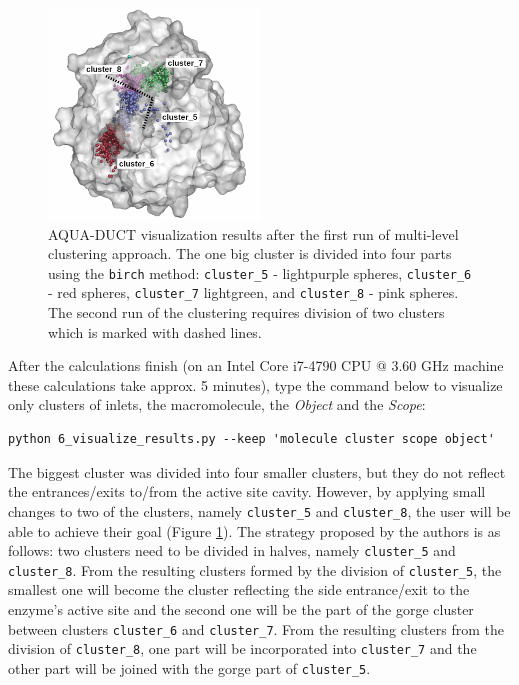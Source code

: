 \documentclass[9pt,tutorial]{livecoms}
\begin{document}
\begin{figure}[ht!]
\centering
\includegraphics[width=0.5\textwidth]{Tut2.1.png}
\caption{AQUA-DUCT visualization results after the first run of multi-level clustering approach. The one big cluster is divided into four parts using the \texttt{birch} method: \texttt{cluster\_5} - lightpurple spheres, \texttt{cluster\_6} - red spheres, \texttt{cluster\_7} lightgreen, and \texttt{cluster\_8} - pink spheres. The second run of the clustering requires division of two clusters which is marked with dashed lines.}
\label{Tut2.1}
\end{figure}

After the calculations finish (on an Intel Core i7-4790 CPU @ 3.60 GHz machine these calculations take approx. 5 minutes), type the command below to visualize only clusters of inlets, the macromolecule, the \emph{Object} and the \emph{Scope}:
\begin{lstlisting}[columns=fullflexible]
python 6_visualize_results.py --keep 'molecule cluster scope object'
\end{lstlisting}

The biggest cluster was divided into four smaller clusters, but they do not reflect the entrances/exits to/from the active site cavity. However, by applying small changes to two of the clusters, namely \texttt{cluster\_5} and \texttt{cluster\_8}, the user will be able to achieve their goal (Figure \ref{Tut2.1}). The strategy proposed by the authors is as follows: two clusters need to be divided in halves, namely \texttt{cluster\_5} and \texttt{cluster\_8}. From the resulting clusters formed by the division of \texttt{cluster\_5}, the smallest one will become the cluster reflecting the side entrance/exit to the enzyme's active site and the second one will be the part of the gorge cluster between clusters \texttt{cluster\_6} and \texttt{cluster\_7}. From the resulting clusters from the division of \texttt{cluster\_8}, one part will be incorporated into \texttt{cluster\_7} and the other part will be joined with the gorge part of \texttt{cluster\_5}. 
\end{document}
